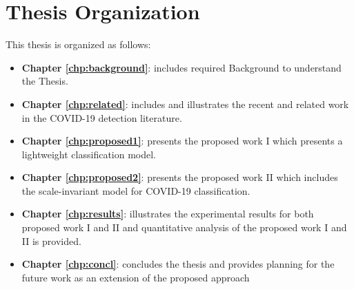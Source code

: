 \section{Thesis Organization}
This thesis is organized as follows: 
\begin{itemize}
    \item \textbf{Chapter \ref{chp:background}}: includes required Background to understand the Thesis. 
    \item \textbf{Chapter \ref{chp:related}}: includes and illustrates the recent and related work in the COVID-19 detection literature. 
    \item \textbf{Chapter \ref{chp:proposed1}}: presents the proposed work I which presents a lightweight classification model.
    \item \textbf{Chapter \ref{chp:proposed2}}: presents the proposed work II which includes the scale-invariant model for COVID-19 classification. 
    \item \textbf{Chapter \ref{chp:results}}: illustrates the experimental results for both proposed work I and II and quantitative analysis of the proposed work I and II is provided.
    \item \textbf{Chapter \ref{chp:concl}}: concludes the thesis and provides planning for the future work as an extension of the proposed approach
\end{itemize}